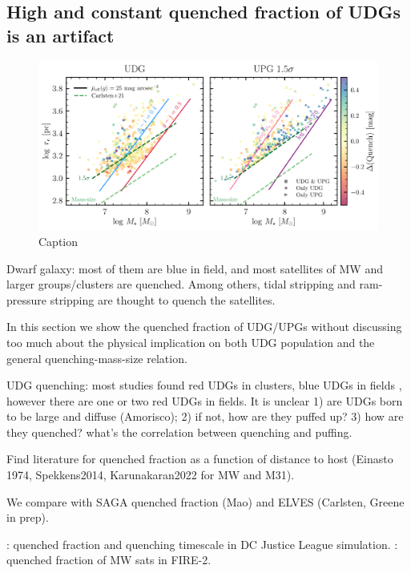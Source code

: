 \documentclass[twocolumn,astrosymb,twocolappendix]{aastex631}
\begin{document}
\begin{CJK*}{UTF8}{gbsn}
\subsection{High and constant quenched fraction of UDGs is an artifact}
\begin{figure}
	\vbox{ 
		\centering
		\includegraphics[width=1\linewidth]{mass_size_plane.pdf}
	}
    \caption{Caption}
    \label{fig:mass_size}
\end{figure}



Dwarf galaxy: most of them are blue in field, and most satellites of MW and larger groups/clusters are quenched. Among others, tidal stripping and ram-pressure stripping are thought to quench the satellites. 

In this section we show the quenched fraction of UDG/UPGs without discussing too much about the physical implication on both UDG population and the general quenching-mass-size relation.

UDG quenching: most studies found red UDGs in clusters, blue UDGs in fields \citep{Prole2019,Leisman2017}, however there are one or two red UDGs in fields. It is unclear 1) are UDGs born to be large and diffuse (Amorisco); 2) if not, how are they puffed up? 3) how are they quenched? what's the correlation between quenching and puffing. 

Find literature for quenched fraction as a function of distance to host (Einasto 1974, Spekkens2014, Karunakaran2022 for MW and M31).

We compare with SAGA quenched fraction (Mao) and ELVES (Carlsten, Greene in prep).

\citep{Baxter2021}

\citep{Akins2021}: quenched fraction and quenching timescale in DC Justice League simulation.
\citep{Samuel2022}: quenched fraction of MW sats in FIRE-2.


\end{CJK*}
\end{document}
